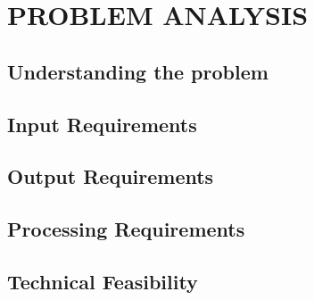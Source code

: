 \documentclass[main]{subfiles}
\begin{document}
\chapter{PROBLEM ANALYSIS}

\section{Understanding the problem}

\section{Input Requirements}

\section{Output Requirements}

\section{Processing Requirements}

\section{Technical Feasibility}
\end{document}
